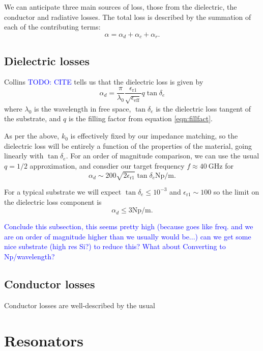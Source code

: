 \documentclass[a4paper]{article}
\newcommand{\cm}[1]{\textcolor{blue}{#1}} %
\begin{document}
We can anticipate three main sources of loss, those from the dielectric, the
conductor and radiative losses. \cite{Simons2004} The total loss is described
by the summation of each of the contributing terms:
\begin{equation}
  \alpha = \alpha_d + \alpha_c + \alpha_r.
\end{equation}

\subsection{Dielectric losses}

Collins \cm{TODO: CITE} tells us that the dielectric loss is given by
\begin{equation}
  \alpha_d =
  \frac{\pi}{\lambda_0}\frac{\epsilon_\mathrm{r1}}{\sqrt{\epsilon_\mathrm{eff}}}
  q \tan \delta_e
\end{equation}
where $\lambda_0$ is the wavelength in free space, $\tan \delta_e$ is the
dielectric loss tangent of the substrate, and $q$ is the filling factor from
equation \ref{eqn:fillfact}.

As per the above, $k_0$ is effectively fixed by our impedance matching, so the
dielectric loss will be entirely a function of the properties of the material,
going linearly with $\tan\delta_e$. For an order of magnitude comparison, we can
use the usual $q=1/2$ approximation, and consdier our target frequency
$f\approx\SI{40}{\giga\hertz}$ for
\begin{equation}
  \alpha_d \sim 200\sqrt{2\epsilon_\mathrm{r1}}\tan\delta_e
  \si{\neper\per\meter}.
\end{equation}

For a typical substrate we will expect $\tan\delta_e\leq10^{-3}$ and
$\epsilon_\mathrm{r1} \sim 100$ so the limit on the dielectric loss component is
\begin{equation}
  \alpha_d \leq 3 \si{\neper\per\meter}.
\end{equation}

\cm{Conclude this subsection, this seems pretty high (because goes like freq.
and we are on order of magnitude higher than we usually would be...) can we get
some nice substrate (high res Si?) to reduce this? What about  Converting to
Np/wavelength?}

\subsection{Conductor losses}

Conductor losses are well-described by the usual 

\section{Resonators}




\end{document}
